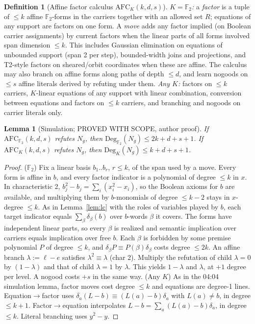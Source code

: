 \documentclass[11pt]{article}
\newtheorem{lemma}[theorem]{Lemma}
\theoremstyle{definition}
\newtheorem{definition}[theorem]{Definition}
\newcommand{\F}{\mathbb{F}_2}
\newcommand{\Deg}{\mathrm{Deg}}
\begin{document}
\begin{definition}[Affine factor calculus $\mathrm{AFC}_K(k,d,s)$]
\emph{$K=\F$:} a \emph{factor} is a tuple of $\le k$ affine $\F$-forms in the carriers together with an allowed set $R$; equations of any support are factors on one form. A \emph{move} adds any factor implied (on Boolean carrier assignments) by current factors when the linear parts of all forms involved span dimension $\le k$. This includes Gaussian elimination on equations of unbounded support (span 2 per step), bounded-width joins and projections, and T2-style factors on sheared/orbit coordinates when these are affine. The calculus may also branch on affine forms along paths of depth $\le d$, and learn nogoods on $\le s$ affine literals derived by refuting under them.
\emph{Any $K$:} factors on $\le k$ carriers, $K$-linear equations of any support with linear combination, conversion between equations and factors on $\le k$ carriers, and branching and nogoods on carrier literals only.
\end{definition}

\begin{lemma}[Simulation; PROVED WITH SCOPE, author proof]\label{lem:sim}
If $\mathrm{AFC}_{\F}(k,d,s)$ refutes $N_g$, then $\Deg_{\F}(N_g)\le2k+d+s+1$. If $\mathrm{AFC}_K(k,d,s)$ refutes $N_g$, then $\Deg_K(N_g)\le k+d+s+1$.
\end{lemma}
\begin{proof}
($\F$) Fix a linear basis $b_1..b_r$, $r\le k$, of the span used by a move. Every form is affine in $b$, and every factor indicator is a polynomial of degree $\le k$ in $x$. In characteristic 2, $b_j^2-b_j=\sum_{i}(x_i^2-x_i)$, so the Boolean axioms for $b$ are available, and multiplying them by $b$-monomials of degree $\le k-2$ stays in $x$-degree $\le k$. As in Lemma~\ref{lem:lc} with the roles of variables played by $b$, each target indicator equals $\sum_\beta\delta_\beta(b)$ over $b$-words $\beta$ it covers. The forms have independent linear parts, so every $\beta$ is realized and semantic implication over carriers equals implication over free $b$. Each $\beta$ is forbidden by some premise polynomial $P$ of degree $\le k$, and $\delta_\beta P\equiv P(\beta)\delta_\beta$ costs degree $\le2k$. An affine branch $\lambda:=\ell-e$ satisfies $\lambda^2\equiv\lambda$ (char 2). Multiply the refutation of child $\lambda=0$ by $(1-\lambda)$ and that of child $\lambda=1$ by $\lambda$. This yields $1-\lambda$ and $\lambda$, at $+1$ degree per level. A nogood costs $+s$ in the same way.
(Any $K$) As in the 04:04 simulation lemma, factor moves cost degree $\le k$ and equations are degree-1 lines. Equation$\to$factor uses $\delta_a(L-b)\equiv(L(a)-b)\delta_a$ with $L(a)\neq b$, in degree $\le k+1$. Factor$\to$equation interpolates $L-b=\sum_a(L(a)-b)\delta_a$, in degree $\le k$. Literal branching uses $y^2-y$.
\end{proof}
\end{document}
